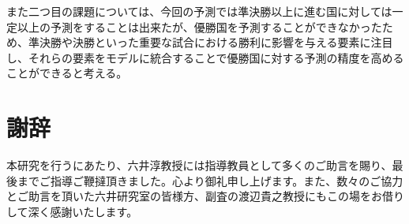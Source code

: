 \documentclass[platex]{suribt}
\begin{document}
また二つ目の課題については、今回の予測では準決勝以上に進む国に対しては一定以上の予測をすることは出来たが、優勝国を予測することができなかったため、準決勝や決勝といった重要な試合における勝利に影響を与える要素に注目し、それらの要素をモデルに統合することで優勝国に対する予測の精度を高めることができると考える。

\backmatter%
\chapter{謝辞}%

本研究を行うにあたり、六井淳教授には指導教員として多くのご助言を賜り、最後までご指導ご鞭撻頂きました。心より御礼申し上げます。また、数々のご協力とご助言を頂いた六井研究室の皆様方、副査の渡辺貴之教授にもこの場をお借りして深く感謝いたします。
\end{document}
